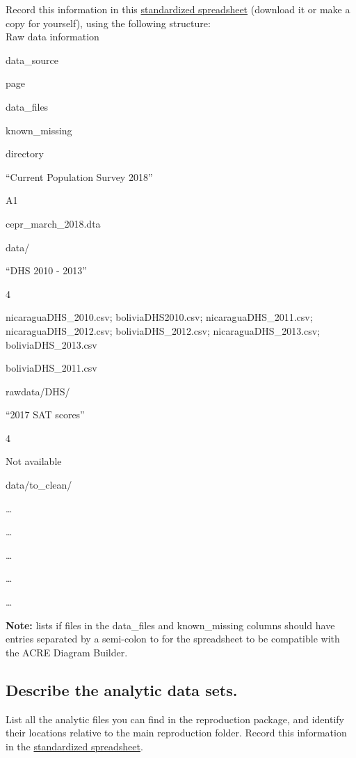 \documentclass[]{book}
\begin{document}
Record this information in this \href{https://docs.google.com/spreadsheets/d/1LUIdVFH0OfR70C7z07TYeE-uWzKI_JIeWUMaYhqEKK0/edit\#gid=0\&range=A1}{standardized spreadsheet} (download it or make a copy for yourself), using the following structure:\\

\label{tab:raw-data-information}Raw data information

data\_source

page

data\_files

known\_missing

directory

``Current Population Survey 2018''

A1

cepr\_march\_2018.dta

data/

``DHS 2010 - 2013''

4

nicaraguaDHS\_2010.csv; boliviaDHS2010.csv; nicaraguaDHS\_2011.csv; nicaraguaDHS\_2012.csv; boliviaDHS\_2012.csv; nicaraguaDHS\_2013.csv; boliviaDHS\_2013.csv

boliviaDHS\_2011.csv

rawdata/DHS/

``2017 SAT scores''

4

Not available

data/to\_clean/

\ldots{}

\ldots{}

\ldots{}

\ldots{}

\ldots{}

\textbf{Note:} lists if files in the data\_files and known\_missing columns should have entries separated by a semi-colon to for the spreadsheet to be compatible with the ACRE Diagram Builder.

\hypertarget{desc-analy}{%
\subsection{Describe the analytic data sets.}\label{desc-analy}}

List all the analytic files you can find in the reproduction package, and identify their locations relative to the main reproduction folder. Record this information in the \href{https://docs.google.com/spreadsheets/d/1LUIdVFH0OfR70C7z07TYeE-uWzKI_JIeWUMaYhqEKK0/edit\#gid=1299317837\&range=A1}{standardized spreadsheet}.
\end{document}
